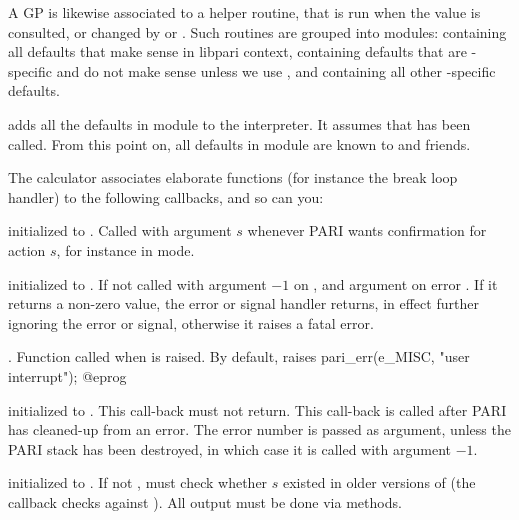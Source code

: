 A GP  is likewise associated to a helper routine, that is run
when the value is consulted, or changed by  or .
Such routines are grouped into modules:  containing all
defaults that make sense in libpari context, 
containing defaults that are -specific and do not make sense unless
we use , and  containing all other
-specific defaults.

 adds all the defaults in
module  to the interpreter. It assumes that  has
been called. From this point on, all defaults in module  are known
to  and friends.


The  calculator associates elaborate functions (for instance the
break loop handler) to the following callbacks, and so can you:

initialized to . Called with argument $s$ whenever PARI wants
confirmation for action $s$, for instance in  mode.

initialized to . If not  called with argument $-1$
on , and argument  on error . If it returns a
non-zero value, the error or signal handler returns, in effect further
ignoring the error or signal, otherwise it raises a fatal error.

.
Function called when  is raised. By default, raises
\bprog
  pari_err(e_MISC, "user interrupt");
@eprog

initialized to . This call-back must not return.
This call-back is called after PARI has cleaned-up from an error.
The error number is passed as argument, unless the PARI stack
has been destroyed, in which case it is called with argument $-1$.

initialized to . If not , must check whether
$s$ existed in older versions of  (the  callback
checks against ). All output must be done via 
methods.

